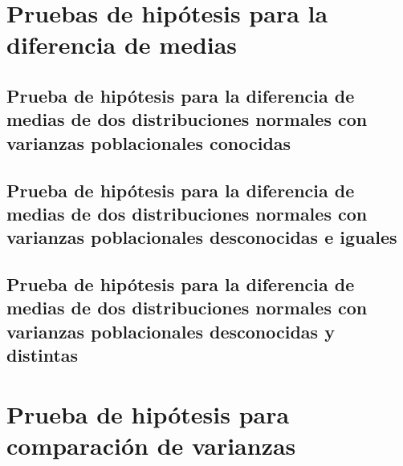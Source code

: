 \documentclass[
]{book}
\theoremstyle{definition}
\theoremstyle{definition}
\theoremstyle{definition}
\theoremstyle{definition}
\theoremstyle{remark}
\begin{document}
\hypertarget{pruebas-de-hipuxf3tesis-para-la-diferencia-de-medias}{%
\section{Pruebas de hipótesis para la diferencia de medias}\label{pruebas-de-hipuxf3tesis-para-la-diferencia-de-medias}}

\hypertarget{prueba-de-hipuxf3tesis-para-la-diferencia-de-medias-de-dos-distribuciones-normales-con-varianzas-poblacionales-conocidas}{%
\subsection*{Prueba de hipótesis para la diferencia de medias de dos distribuciones normales con varianzas poblacionales conocidas}\label{prueba-de-hipuxf3tesis-para-la-diferencia-de-medias-de-dos-distribuciones-normales-con-varianzas-poblacionales-conocidas}}

\hypertarget{prueba-de-hipuxf3tesis-para-la-diferencia-de-medias-de-dos-distribuciones-normales-con-varianzas-poblacionales-desconocidas-e-iguales}{%
\subsection*{Prueba de hipótesis para la diferencia de medias de dos distribuciones normales con varianzas poblacionales desconocidas e iguales}\label{prueba-de-hipuxf3tesis-para-la-diferencia-de-medias-de-dos-distribuciones-normales-con-varianzas-poblacionales-desconocidas-e-iguales}}

\hypertarget{prueba-de-hipuxf3tesis-para-la-diferencia-de-medias-de-dos-distribuciones-normales-con-varianzas-poblacionales-desconocidas-y-distintas}{%
\subsection*{Prueba de hipótesis para la diferencia de medias de dos distribuciones normales con varianzas poblacionales desconocidas y distintas}\label{prueba-de-hipuxf3tesis-para-la-diferencia-de-medias-de-dos-distribuciones-normales-con-varianzas-poblacionales-desconocidas-y-distintas}}

\hypertarget{prueba-de-hipuxf3tesis-para-comparaciuxf3n-de-varianzas}{%
\section{Prueba de hipótesis para comparación de varianzas}\label{prueba-de-hipuxf3tesis-para-comparaciuxf3n-de-varianzas}}
\end{document}

